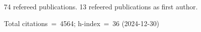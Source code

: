 74 refereed publications. 13 refeered publications as first author.

Total citations~=~4564; h-index~=~36 (2024-12-30)